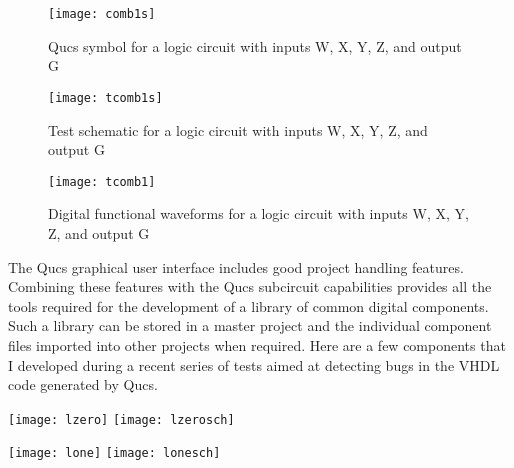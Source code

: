 \begin{figure}
  \centering
  \texttt{[image: comb1s]}
  \caption{Qucs symbol for a logic circuit with inputs W, X, Y, Z, and output G}
  \label{fig:comb1s}
\end{figure}
\FloatBarrier

\begin{figure}
  \centering
  \texttt{[image: tcomb1s]}
  \caption{Test schematic for a logic circuit with inputs W, X, Y, Z, and output G}
  \label{fig:tcomb1s}
\end{figure}
\FloatBarrier

\begin{figure}
  \centering
  \texttt{[image: tcomb1]}
  \caption{Digital functional waveforms for a logic circuit with inputs W, X, Y, Z, and output G}
  \label{fig:tcomb1}
\end{figure}
\FloatBarrier


The Qucs graphical user interface includes good project handling
features.  Combining these features with the Qucs subcircuit
capabilities provides all the tools required for the development of a
library of common digital components.  Such a library can be stored in
a master project and the individual component files imported into
other projects when required.  Here are a few components that I
developed during a recent series of tests aimed at detecting bugs in
the VHDL code generated by Qucs.


\begin{flushleft}
  \texttt{[image: lzero]} \hspace{10mm} \texttt{[image: lzerosch]}

\end{flushleft}


\begin{flushleft}
  \texttt{[image: lone]} \hspace{10mm} \texttt{[image: lonesch]}
\end{flushleft}

